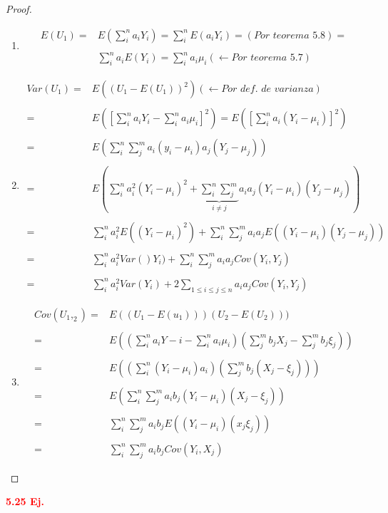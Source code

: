 \documentclass[12pt,letterpaper]{article}
\theoremstyle{definition}
\begin{document}
\begin{proof}
\hfill
	\begin{enumerate}
		\item 
		\[
		\begin{array}{rl}
			E(U_1)= &E(\sum^n_i  a_iY_i)=\sum^n_iE(a_iY_i)=(\mathrm{\textit{Por teorema 5.8}})=\\ \\
			&\sum^n_i a_i E(Y_i)=\sum^n_ia_i\mu_i(\leftarrow \textit{Por teorema 5.7})
		\end{array}
		\]
		\item 
		\[
		\begin{array}{rl}
			Var(U_1)=& E((U_1-E(U_1))^2)(\leftarrow \textit{Por def. de varianza})\\ \\
			=& E(\left[\sum^n_ia_iY_i-\sum^n_ia_i\mu_i\right]^2)=E(\left[\sum^n_ia_i(Y_i-\mu_i)\right]^2)\\ \\
			=& E(\sum^n_i\sum^m_j a_i(y_i-\mu_i)a_j(Y_j-\mu_j))\\ \\
			=& E(\sum^n_ia_i^2(Y_i-\mu_i)^2+\underbrace{\sum^n_i\sum^m_j}_{i\neq j}a_ia_j(Y_i-\mu_i)(Y_j-\mu_j))\\ \\
			=& \sum^n_ia_i^2 E((Y_i-\mu_i)^2)+\sum^n_i\sum^m_ja_ia_j E((Y_i-\mu_i)(Y_j-\mu_j))\\ \\
			=&\sum^n_ia_i^2 Var()Y_i)+\sum^n_i\sum^m_j a_ia_j Cov(Y_i,Y_j)\\ \\
			=& \sum^n_ia_i^2 Var(Y_i)+ 2\sum_{1\leq i\leq j\leq n}a_ia_j Cov(Y_i,Y_j)
		\end{array}
		\]
		\item 
		\[
		\begin{array}{rl}
			Cov(U_1,_2)=& E((U_1-E(u_1)))(U_2-E(U_2)))\\ \\
			=& E((\sum^n_ia_iY-i-\sum^n_ia_i\mu_i)(\sum^m_jb_jX_j-\sum^m_jb_j\xi_j))\\ \\
			=& E((\sum^n_i(Y_i-\mu_i)a_i)(\sum^m_jb_j(X_j-\xi_j)))\\ \\
			=& E(\sum^n_i\sum^m_ja_ib_j(Y_i-\mu_i)(X_j-\xi_j))\\ \\
			=&\sum^n_i\sum^m_j a_ib_j E((Y_i-\mu_i)(x_j\xi_j))\\ \\
			=& \sum^n_i\sum^m_j a_ib_j Cov(Y_i,X_j)
		\end{array}
		\]
	\end{enumerate}
\end{proof}
\textbf{\textcolor{red}{5.25 Ej.}}
\end{document}
